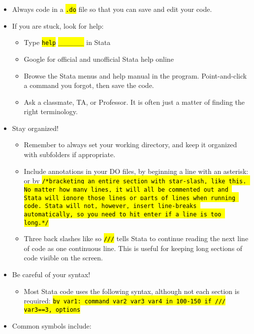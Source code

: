 \documentclass{tufte-handout}
\begin{document}
\begin{itemize}
\item Always code in a {\tt \hl{.do}} file so that you can save and edit your code.
\item If you are stuck, look for help:
	\begin{itemize}
	\item Type {\tt \hl{help}}\hl{ \_\_\_\_\_} in Stata
	\item Google for official and unofficial Stata help online
	\item Browse the Stata menus and help manual in the program. Point-and-click a command you forgot, then save the code.
 	\item Ask a classmate, TA, or Professor. It is often just a matter of finding the right terminology.
	\end{itemize}
\item Stay organized!
	\begin{itemize}
	\item Remember to always set your working directory, and keep it organized with subfolders if appropriate.
	\item Include annotations in your DO files, by beginning a line with an asterisk:  \newline or by {\tt \hl{/*bracketing an entire section with star-slash, like this. No matter how many lines, it will all be commented out and Stata will ignore those lines or parts of lines when running code. Stata will not, however, insert line-breaks automatically, so you need to hit enter if a line is too long.*/}}
	\item Three back slashes like so {\tt \hl{///}} \newline tells Stata to continue reading the next line of code as one continuous line. This is useful for keeping long sections of code visible on the screen.
	\end{itemize}
\item Be careful of your syntax!
	\begin{itemize}
	\item Most Stata code uses the following syntax, although not each section is required:\newline
	{\tt \hl{by var1: command var2 var3 var4 in 100-150 if ///}} \newline
	{\tt \hl{var3==3, options}}
		\end{itemize}
\item Common symbols include:

\end{itemize}
\end{document}
